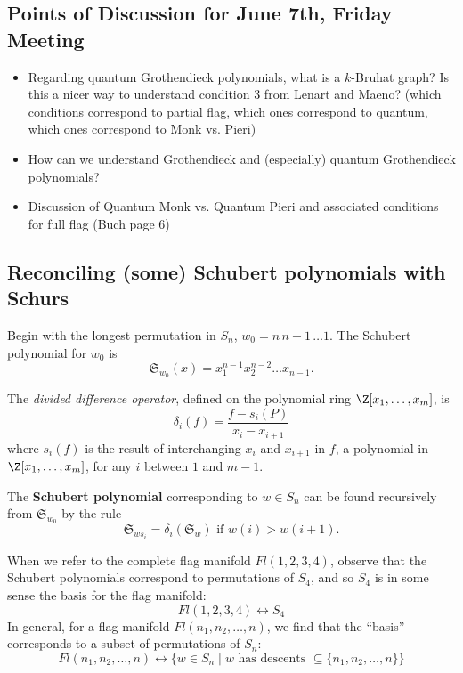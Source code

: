 \subsection{Points of Discussion for June 7th, Friday Meeting}

\begin{itemize}
    \item Regarding quantum Grothendieck polynomials, what is a $k$-Bruhat graph? Is this a nicer way to understand condition 3 from Lenart and Maeno? (which conditions correspond to partial flag, which ones correspond to quantum, which ones correspond to Monk vs. Pieri)
    \item How can we understand Grothendieck and (especially) quantum Grothendieck polynomials? 
    \item Discussion of Quantum Monk vs. Quantum Pieri and associated conditions for full flag (Buch page 6)

\end{itemize}


\subsection{Reconciling (some) Schubert polynomials with Schurs}

Begin with the longest permutation in $S_n$, $w_0 = n \, n-1 \, \dots 1$. The Schubert polynomial for $w_0$ is
\[
    \mathfrak{S}_{w_0}(x) = x_1^{n-1} x_2^{n-2} \dots x_{n-1}.
\]

\begin{definition}
The \textit{divided difference operator}, defined on the polynomial ring $\Z[x_1, \dots, x_m]$, is
\[
    \delta_i(f) = \frac{f - s_i(P)}{x_i - x_{i+1}}
\] 
where $s_i(f)$ is the result of interchanging $x_i$ and $x_{i+1}$ in $f$, a polynomial in $\Z[x_1, \dots, x_m]$, for any $i$ between $1$ and $m-1$.
\end{definition}

\begin{definition}
The \textbf{Schubert polynomial} corresponding to $w \in S_n$ can be found recursively from $\mathfrak{S}_{w_0}$ by the rule
\[
    \mathfrak{S}_{ws_i} = \delta_i(\mathfrak{S}_w) \text{ if $w(i) > w(i+1)$}.
\]
\end{definition}


When we refer to the complete flag manifold $Fl(1, 2, 3, 4)$, observe that the Schubert polynomials correspond to permutations of $S_4$, and so $S_4$ is in some sense the basis for the flag manifold:
\[
    Fl(1, 2, 3, 4) \leftrightarrow S_4
\]
In general, for a flag manifold $Fl(n_1, n_2, \dots, n)$, we find that the ``basis'' corresponds to a subset of permutations of $S_n$:
\[
    Fl(n_1, n_2, \dots, n) \leftrightarrow \{ w \in S_n \mid w \text{ has descents } \subseteq \{ n_1, n_2, \dots, n\} \}
\]

